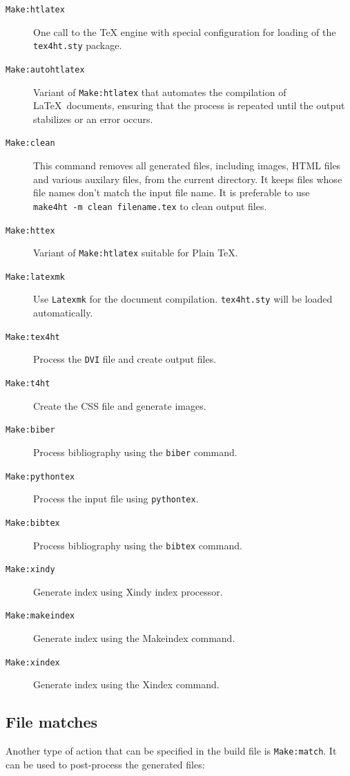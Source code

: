 \begin{description}
\item[\texttt{Make:htlatex}]
One call to the TeX engine with special configuration for loading of the
\texttt{tex4ht.sty} package.
\item[\texttt{Make:autohtlatex}]
Variant of \texttt{Make:htlatex} that automates the compilation of
\LaTeX~documents, ensuring that the process is repeated until the output
stabilizes or an error occurs.
\item[\texttt{Make:clean}]
This command removes all generated files, including images, HTML files
and various auxilary files, from the current directory. It keeps files
whose file names don't match the input file name. It is preferable to
use \texttt{make4ht\ -m\ clean\ filename.tex} to clean output files.
\item[\texttt{Make:httex}]
Variant of \texttt{Make:htlatex} suitable for Plain \TeX.
\item[\texttt{Make:latexmk}]
Use \texttt{Latexmk} for the document compilation. \texttt{tex4ht.sty}
will be loaded automatically.
\item[\texttt{Make:tex4ht}]
Process the \texttt{DVI} file and create output files.
\item[\texttt{Make:t4ht}]
Create the CSS file and generate images.
\item[\texttt{Make:biber}]
Process bibliography using the \texttt{biber} command.
\item[\texttt{Make:pythontex}]
Process the input file using \texttt{pythontex}.
\item[\texttt{Make:bibtex}]
Process bibliography using the \texttt{bibtex} command.
\item[\texttt{Make:xindy}]
Generate index using Xindy index processor.
\item[\texttt{Make:makeindex}]
Generate index using the Makeindex command.
\item[\texttt{Make:xindex}]
Generate index using the Xindex command.
\end{description}

\subsection{File matches}\label{file-matches}

\label{sec:postprocessing}

Another type of action that can be specified in the build file is
\texttt{Make:match}. It can be used to post-process the generated files:

